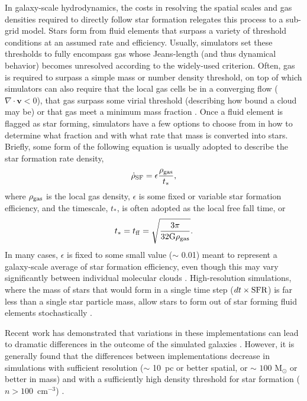 In galaxy-scale hydrodynamics, the costs in resolving the spatial scales and gas densities required to directly follow star formation relegates this process to a sub-grid model. Stars form from fluid elements that surpass a variety of threshold conditions at an assumed rate and efficiency. Usually, simulators set these thresholds to fully encompass gas whose Jeans-length (and thus dynamical behavior) becomes unresolved according to the widely-used \cite{Truelove1997} criterion. Often, gas is required to surpass a simple mass or number density threshold, on top of which simulators can also require that the local gas cells be in a converging flow ($\nabla \cdot \bm{v} < 0$), that gas surpass some virial threshold (describing how bound a cloud may be)
or that gas meet a minimum \Hmolecular mass fraction \citep[e.g.][]{Kuhlen2012}
. Once a fluid element is flagged as star forming, simulators have a few options to choose from in how to determine what fraction and with what rate that mass is converted into stars. Briefly, some form of the following equation is usually adopted to describe the star formation rate density,
\begin{equation}
\label{intro:eq:sfr}
 \dot{\rho}_{\rm SF} = \epsilon \frac{\rho_{\rm gas}}{t_*},
\end{equation}
where $\rho_{\rm gas}$ is the local gas density, $\epsilon$ is some fixed or variable star formation efficiency, and the timescale, $t_*$, is often adopted as the local free fall time, or
\begin{equation}
  t_* = t_{\rm ff} = \sqrt{\frac{3\pi}{32 \rm{G} \rho_{\rm gas}}}.
\end{equation}
In many cases, $\epsilon$ is fixed to some small value ($\sim$ 0.01) \citep{KrumholzTan2007} meant to represent a galaxy-scale average of star formation efficiency, even though this may vary significantly between individual molecular clouds \citep{Grudic2018}. High-resolution simulations, where the mass of stars that would form in a single time step ($dt \times \rm{SFR}$) is far less than a single star particle mass, allow stars to form out of star forming fluid elements stochastically \citep[e.g.][]{Goldbaum2015}.

Recent work has demonstrated that variations in these implementations can lead to dramatic differences in the outcome of the simulated galaxies \citep[e.g.][]{Hopkins2013,Munshi2018}. However, it is generally found that the differences between implementations decrease in simulations with sufficient resolution ($\sim$ 10~pc or better spatial, or $\sim$ $100$ M$_{\odot}$ or better in mass) and with a sufficiently high density threshold for star formation ($n > 100$~cm$^{-3}$) \citep{Orr2018,FIRE2}.


